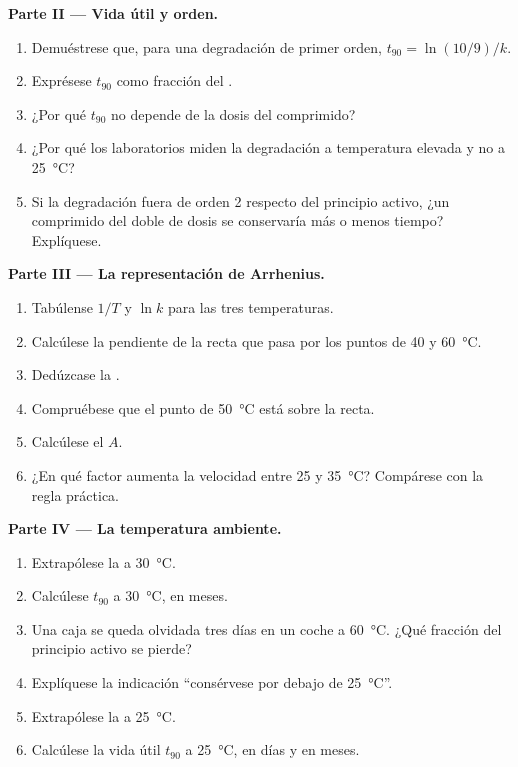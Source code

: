 \begin{problem}
\medskip
\noindent\textbf{Parte II --- Vida útil y orden.}
\begin{enumerate}[resume]
  \item Demuéstrese que, para una degradación de primer orden,
        $t_{90} = \ln(10/9)/k$.
  \item Exprésese $t_{90}$ como fracción del .
  \item ¿Por qué $t_{90}$ no depende de la dosis del comprimido?
  \item ¿Por qué los laboratorios miden la degradación a temperatura
        elevada y no a \qty{25}{\celsius}?
  \item Si la degradación fuera de orden 2 respecto del principio activo,
        ¿un comprimido del doble de dosis se conservaría más o menos
        tiempo? Explíquese.
\end{enumerate}

\medskip
\noindent\textbf{Parte III --- La representación de Arrhenius.}
\begin{enumerate}[resume]
  \item Tabúlense $1/T$ y $\ln k$ para las tres temperaturas.
  \item Calcúlese la pendiente de la recta que pasa por los puntos de 40 y
        \qty{60}{\celsius}.
  \item Dedúzcase la .
  \item Compruébese que el punto de \qty{50}{\celsius} está sobre la
        recta.
  \item Calcúlese el  $A$.
  \item ¿En qué factor aumenta la velocidad entre 25 y
        \qty{35}{\celsius}? Compárese con la regla práctica.
\end{enumerate}

\medskip
\noindent\textbf{Parte IV --- La temperatura ambiente.}
\begin{enumerate}[resume]
  \item Extrapólese la  a \qty{30}{\celsius}.
  \item Calcúlese $t_{90}$ a \qty{30}{\celsius}, en meses.
  \item Una caja se queda olvidada tres días en un coche a
        \qty{60}{\celsius}. ¿Qué fracción del principio activo se pierde?
  \item Explíquese la indicación ``consérvese por debajo de
        \qty{25}{\celsius}''.
  \item Extrapólese la  a \qty{25}{\celsius}.
  \item Calcúlese la vida útil $t_{90}$ a \qty{25}{\celsius}, en días y en
        meses.
\end{enumerate}
\end{problem}
